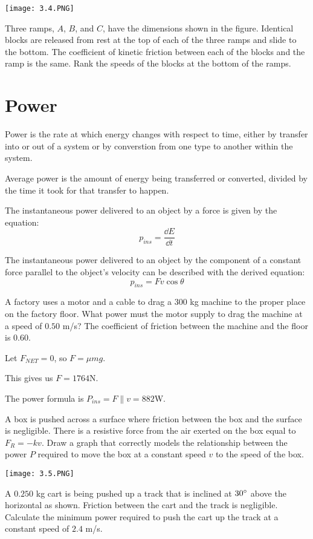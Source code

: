 \documentclass[../mech.tex]{subfiles}
\begin{document}
\ex \begin{center}
    \texttt{[image: 3.4.PNG]}
\end{center}
Three ramps, $A$, $B$, and $C$, have the dimensions shown in the figure. Identical blocks are released from rest at the top of each of the three ramps and slide to the bottom. The coefficient of kinetic friction between each of the blocks and the ramp is the same. 
Rank the speeds of the blocks at the bottom of the ramps.

\section{Power}
Power is the rate at which energy changes with respect to time, either by transfer into or out of a system or by converstion from one type to another within the system.

Average power is the amount of energy being transferred or converted, divided by the time it took for that transfer to happen.

The instantaneous power delivered to an object by a force is given by the equation:
\[ p_{ins}=\frac{\dd E}{\dd t} \]

The instantaneous power delivered to an object by the component of a constant force parallel to the object's velocity can be described with the derived equation:
\[ p_{ins}=Fv\cos\theta \]

\begin{example}
    A factory uses a motor and a cable to drag a $300$ kg machine to the proper place on the factory floor. What power must the motor supply to drag the machine at a speed of $0.50$ m/s? The coefficient of friction 
    between the machine and the floor is $0.60$.

    Let $F_{NET}=0$, so $F = \mu m g$.

    This gives us $F=1764$N.

    The power formula is $P_{ins}=F{\parallel}v = 882$W.
\end{example}

\ex A box is pushed across a surface where friction between the box and the surface is negligible. There is a resistive force from the air exerted on the box equal to $F_R=-kv$. Draw a graph that correctly models the relationship
between the power $P$ required to move the box at a constant speed $v$ to the speed of the box.

\ex \begin{center}
    \texttt{[image: 3.5.PNG]}
\end{center}
A $0.250$ kg cart is being pushed up a track that is inclined at $30\degree$ above the horizontal as shown. Friction between the cart and the track is negligible. Calculate the minimum power required to push the cart up the track at a constant speed of $2.4$ m/s.
\end{document}
